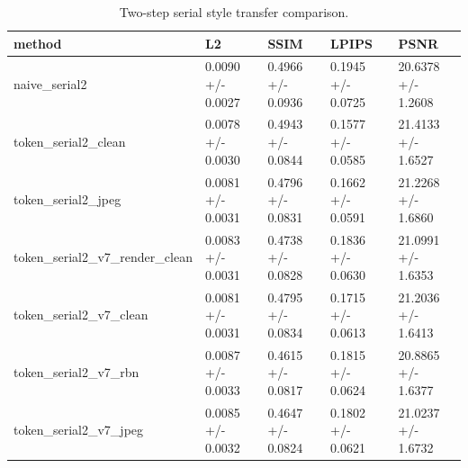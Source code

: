 \begin{table}
\caption{Two-step serial style transfer comparison.}
\label{tab:serial2}
\begin{tabular}{lllll}
\toprule
method & L2 & SSIM & LPIPS & PSNR \\
\midrule
naive_serial2 & 0.0090 +/- 0.0027 & 0.4966 +/- 0.0936 & 0.1945 +/- 0.0725 & 20.6378 +/- 1.2608 \\
token_serial2_clean & 0.0078 +/- 0.0030 & 0.4943 +/- 0.0844 & 0.1577 +/- 0.0585 & 21.4133 +/- 1.6527 \\
token_serial2_jpeg & 0.0081 +/- 0.0031 & 0.4796 +/- 0.0831 & 0.1662 +/- 0.0591 & 21.2268 +/- 1.6860 \\
token_serial2_v7_render_clean & 0.0083 +/- 0.0031 & 0.4738 +/- 0.0828 & 0.1836 +/- 0.0630 & 21.0991 +/- 1.6353 \\
token_serial2_v7_clean & 0.0081 +/- 0.0031 & 0.4795 +/- 0.0834 & 0.1715 +/- 0.0613 & 21.2036 +/- 1.6413 \\
token_serial2_v7_rbn & 0.0087 +/- 0.0033 & 0.4615 +/- 0.0817 & 0.1815 +/- 0.0624 & 20.8865 +/- 1.6377 \\
token_serial2_v7_jpeg & 0.0085 +/- 0.0032 & 0.4647 +/- 0.0824 & 0.1802 +/- 0.0621 & 21.0237 +/- 1.6732 \\
\bottomrule
\end{tabular}
\end{table}
